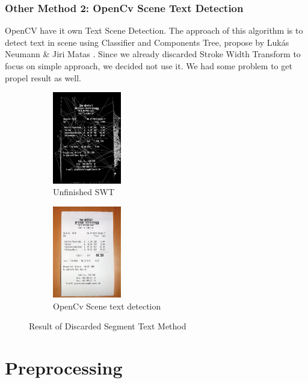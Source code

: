 \documentclass[Report.tex]{subfiles}
\begin{document}
\begin{flushleft}
  \subsubsection{Other Method 2: OpenCv Scene Text Detection}
  OpenCV have it own Text Scene Detection. The approach of this algorithm is to detect text in scene using Classifier and Components Tree, propose by Lukás Neumann \& Jiri Matas \cite{neumann_real-time_2012}. Since we already discarded Stroke Width Transform to focus on simple approach, we decided not use it. We had some problem to get propel result as well.
\end{flushleft}

\begin{figure}[ht]
  \centering
  \begin{subfigure}[t]{4cm}
    \includegraphics[width=3cm]{res/swt.png}
    \caption{Unfinished SWT}
  \end{subfigure}
  \hspace{5mm}%
  \begin{subfigure}[t]{4cm}
    \includegraphics[width=3cm]{res/OpenCV_Std.png}
    \caption{OpenCv Scene text detection}
  \end{subfigure}
  \hspace{5mm}%
  \caption{Result of Discarded Segment Text Method}
  \label{fig:Text_detection_result}
\end{figure}

\section{Preprocessing}
\end{document}
